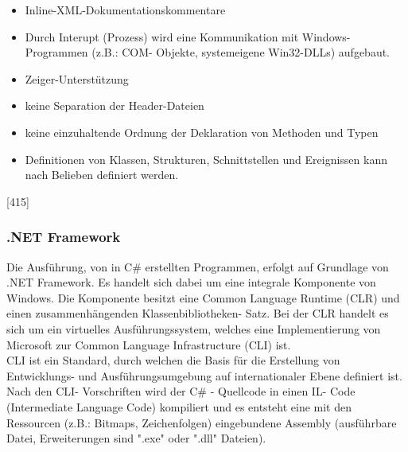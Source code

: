 \documentclass[12pt,a4paper]{report}
\begin{document}
\begin{onehalfspace}
\begin{itemize}
\item Inline-XML-Dokumentationskommentare
\item Durch Interupt (Prozess) wird eine Kommunikation mit Windows- Programmen (z.B.: COM- Objekte, systemeigene Win32-DLLs) aufgebaut.
\item Zeiger-Unterstützung
\item keine Separation der Header-Dateien
\item keine einzuhaltende Ordnung der Deklaration von Methoden und Typen
\item Definitionen von Klassen, Strukturen, Schnittstellen und Ereignissen kann nach Belieben definiert werden.
\end{itemize}
[415]

\subsubsection{.NET Framework}
Die Ausführung, von in C\# erstellten Programmen, erfolgt auf Grundlage von .NET Framework. Es handelt sich dabei um eine integrale Komponente von Windows. Die Komponente besitzt eine Common Language Runtime (CLR) und einen zusammenhängenden Klassenbibliotheken- Satz. Bei der CLR handelt es sich um ein virtuelles Ausführungssystem, welches eine Implementierung von Microsoft zur Common Language Infrastructure (CLI) ist.\\

CLI ist ein Standard, durch welchen die Basis für die Erstellung von Entwicklungs- und Ausführungsumgebung auf internationaler Ebene definiert ist. Nach den CLI- Vorschriften wird der C\# - Quellcode in einen IL- Code (Intermediate Language Code) kompiliert und es entsteht eine mit den Ressourcen (z.B.: Bitmaps, Zeichenfolgen) eingebundene Assembly (ausführbare Datei, Erweiterungen sind "{}.exe"{} oder "{}.dll"{} Dateien).\\


\end{onehalfspace}
\end{document}

